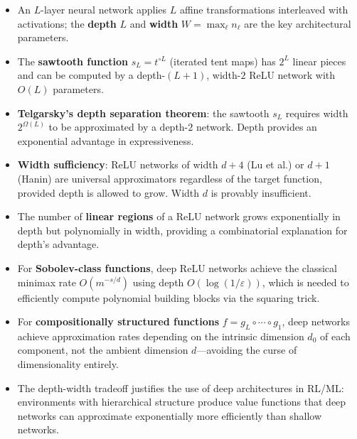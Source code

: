 \documentclass[11pt,a4paper]{article}
\begin{document}
\begin{itemize}
  \item An $L$-layer neural network applies $L$ affine transformations
    interleaved with activations; the \textbf{depth} $L$ and
    \textbf{width} $W = \max_\ell n_\ell$ are the key architectural
    parameters.

  \item The \textbf{sawtooth function} $s_L = t^{\circ L}$ (iterated
    tent maps) has $2^L$ linear pieces and can be computed by a
    depth-$(L+1)$, width-$2$ ReLU network with $O(L)$ parameters.

  \item \textbf{Telgarsky's depth separation theorem}: the sawtooth
    $s_L$ requires width $2^{\Omega(L)}$ to be approximated by a
    depth-$2$ network.  Depth provides an exponential advantage in
    expressiveness.

  \item \textbf{Width sufficiency}: ReLU networks of width $d + 4$
    (Lu et al.) or $d + 1$ (Hanin) are universal approximators
    regardless of the target function, provided depth is allowed to
    grow.  Width $d$ is provably insufficient.

  \item The number of \textbf{linear regions} of a ReLU network grows
    exponentially in depth but polynomially in width, providing a
    combinatorial explanation for depth's advantage.

  \item For \textbf{Sobolev-class functions}, deep ReLU networks
    achieve the classical minimax rate $O(m^{-s/d})$ using depth
    $O(\log(1/\varepsilon))$, which is needed to efficiently compute
    polynomial building blocks via the squaring trick.

  \item For \textbf{compositionally structured functions}
    $f = g_L \circ \cdots \circ g_1$, deep networks achieve
    approximation rates depending on the intrinsic dimension $d_0$
    of each component, not the ambient dimension $d$---avoiding the
    curse of dimensionality entirely.

  \item The depth-width tradeoff justifies the use of deep
    architectures in RL/ML: environments with hierarchical structure
    produce value functions that deep networks can approximate
    exponentially more efficiently than shallow networks.
\end{itemize}
\end{document}
